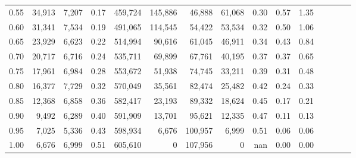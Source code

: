 \begin{tabular}{rrrcrrrrrrrrrrr}
0.55 &  34,913 &  7,207 &                                       0.17 &  459,724 &  145,886 &   46,888 &   61,068 &  0.30 &  0.57 &                         1.35 \\
0.60 &  31,341 &  7,534 &                                       0.19 &  491,065 &  114,545 &   54,422 &   53,534 &  0.32 &  0.50 &                         1.06 \\
0.65 &  23,929 &  6,623 &                                       0.22 &  514,994 &   90,616 &   61,045 &   46,911 &  0.34 &  0.43 &                         0.84 \\
0.70 &  20,717 &  6,716 &                                       0.24 &  535,711 &   69,899 &   67,761 &   40,195 &  0.37 &  0.37 &                         0.65 \\
0.75 &  17,961 &  6,984 &                                       0.28 &  553,672 &   51,938 &   74,745 &   33,211 &  0.39 &  0.31 &                         0.48 \\
0.80 &  16,377 &  7,729 &                                       0.32 &  570,049 &   35,561 &   82,474 &   25,482 &  0.42 &  0.24 &                         0.33 \\
0.85 &  12,368 &  6,858 &                                       0.36 &  582,417 &   23,193 &   89,332 &   18,624 &  0.45 &  0.17 &                         0.21 \\
0.90 &   9,492 &  6,289 &                                       0.40 &  591,909 &   13,701 &   95,621 &   12,335 &  0.47 &  0.11 &                         0.13 \\
0.95 &   7,025 &  5,336 &                                       0.43 &  598,934 &    6,676 &  100,957 &    6,999 &  0.51 &  0.06 &                         0.06 \\
1.00 &   6,676 &  6,999 &                                       0.51 &  605,610 &        0 &  107,956 &        0 &   nan &  0.00 &                         0.00 \\
\bottomrule
\end{tabular}
